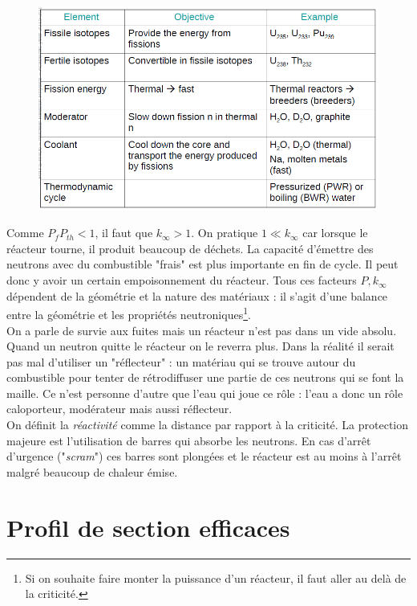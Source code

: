 	\begin{figure}
	\vspace{-5mm}
	\includegraphics[scale=0.33]{ch1/image8.png}
	\end{figure}
Comme $P_fP_{th} < 1$, il faut que $k_\infty > 1$. On pratique $1 \ll k_\infty$ car lorsque le 
réacteur tourne, il produit beaucoup de déchets. La capacité d'émettre des neutrons avec du 
combustible "frais" est plus importante en fin de cycle. Il peut donc y avoir un certain 
empoisonnement du réacteur. Tous ces facteurs $P,k_\infty$ dépendent de la géométrie et la 
nature des matériaux : il s'agit d'une balance entre la géométrie et les propriétés 
neutroniques\footnote{Si on souhaite faire monter la puissance d'un réacteur, il faut 
aller au delà de la criticité.}.\\


On a parle de survie aux fuites  mais un réacteur n'est pas dans un vide absolu. Quand un 
neutron quitte le réacteur on le reverra plus. Dans la réalité il serait pas mal d'utiliser 
un "réflecteur" : un matériau qui se trouve autour du combustible pour tenter de 
rétrodiffuser une partie de ces neutrons qui se font la maille. Ce n'est personne d'autre 
que l'eau qui joue ce rôle : l'eau a donc un rôle caloporteur, modérateur mais aussi réflecteur. \\

On définit la \textit{réactivité} comme la distance par rapport à la criticité. La protection 
majeure est l'utilisation de barres qui absorbe les neutrons. En cas d'arrêt d'urgence 
("\textit{scram}") ces barres sont plongées et le réacteur est au moins à l'arrêt malgré beaucoup de
chaleur émise.

\section{Profil de section efficaces}
